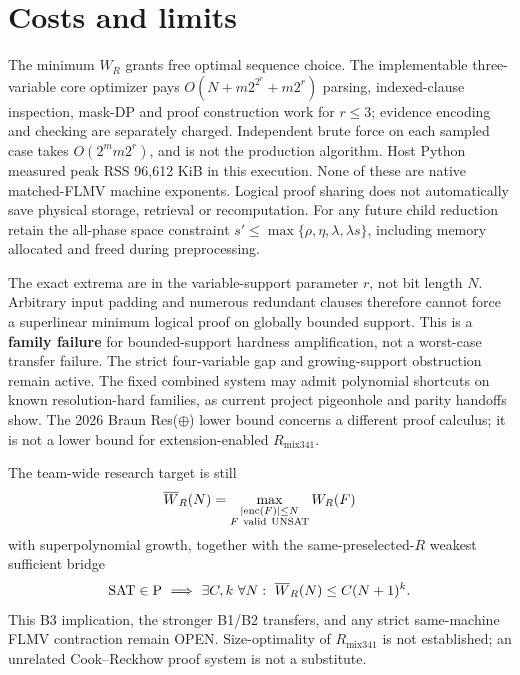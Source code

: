 \documentclass[11pt]{article}
\begin{document}
\section{Costs and limits}
The minimum $W_R$ grants free optimal sequence choice. The implementable three-variable core optimizer pays $O(N+m2^{2^r}+m2^r)$ parsing, indexed-clause inspection, mask-DP and proof construction work for $r\le3$; evidence encoding and checking are separately charged. Independent brute force on each sampled case takes $O(2^m m2^r)$, and is not the production algorithm. Host Python measured peak RSS 96,612 KiB in this execution. None of these are native matched-FLMV machine exponents. Logical proof sharing does not automatically save physical storage, retrieval or recomputation. For any future child reduction retain the all-phase space constraint $s'\le\max\{\rho,\eta,\lambda,\lambda s\}$, including memory allocated and freed during preprocessing.

The exact extrema are in the variable-support parameter $r$, not bit length $N$. Arbitrary input padding and numerous redundant clauses therefore cannot force a superlinear minimum logical proof on globally bounded support. This is a \textbf{family failure} for bounded-support hardness amplification, not a worst-case transfer failure. The strict four-variable gap and growing-support obstruction remain active. The fixed combined system may admit polynomial shortcuts on known resolution-hard families, as current project pigeonhole and parity handoffs show. The 2026 Braun Res($\oplus$) lower bound concerns a different proof calculus; it is not a lower bound for extension-enabled $R_{\mathrm{mix341}}$.

The team-wide research target is still
\[
\overline W_R(N)=\max_{\substack{|{\rm enc}(F)|\le N\\F\ \mathrm{valid\ UNSAT}}}W_R(F)
\]
with superpolynomial growth, together with the same-preselected-$R$ weakest sufficient bridge
\[
{\rm SAT}\in{\rm P}\ \Longrightarrow\ \exists C,k\ \forall N:\
\overline W_R(N)\le C(N+1)^k.
\]
This B3 implication, the stronger B1/B2 transfers, and any strict same-machine FLMV contraction remain OPEN. Size-optimality of $R_{\mathrm{mix341}}$ is not established; an unrelated Cook--Reckhow proof system is not a substitute.
\end{document}
